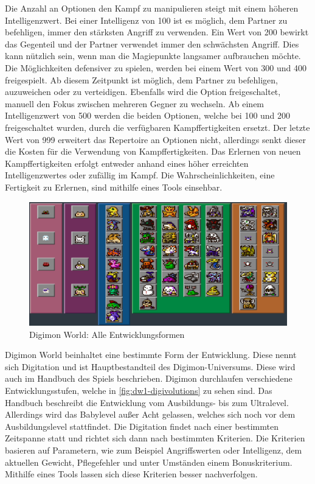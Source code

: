 Die Anzahl an Optionen den Kampf zu manipulieren steigt mit einem höheren Intelligenzwert. Bei einer Intelligenz von 100 ist es möglich, dem Partner zu befehligen, immer den stärksten Angriff zu verwenden. Ein Wert von 200 bewirkt das Gegenteil und der Partner verwendet immer den schwächsten Angriff. Dies kann nützlich sein, wenn man die Magiepunkte langsamer aufbrauchen möchte. Die Möglichkeiten defensiver zu spielen, werden bei einem Wert von 300 und 400 freigespielt. Ab diesem Zeitpunkt ist möglich, dem Partner zu befehligen, auzuweichen oder zu verteidigen. Ebenfalls wird die Option freigeschaltet, manuell den Fokus zwischen mehreren Gegner zu wechseln. Ab einem Intelligenzwert von 500 werden die beiden Optionen, welche bei 100 und 200 freigeschaltet wurden, durch die verfügbaren Kampffertigkeiten ersetzt. Der letzte Wert von 999 erweitert das Repertoire an Optionen nicht, allerdings senkt dieser die Kosten für die Verwendung von Kampffertigkeiten. Das Erlernen von neuen Kampffertigkeiten erfolgt entweder anhand eines höher erreichten Intelligenzwertes oder zufällig im Kampf. Die Wahrscheinlichkeiten, eine Fertigkeit zu Erlernen, sind mithilfe eines Tools einsehbar\cite{move-tool}. \\

\begin{figure}[H]
\begin{center}
\includegraphics[width=1\columnwidth]{figures/screenshots/digivolutions.png}
  \caption{\label{fig:dw1-digivolutions} Digimon World: Alle Entwicklungsformen}
\end{center}
\end{figure}

Digimon World beinhaltet eine bestimmte Form der Entwicklung. Diese nennt sich Digitation und ist Hauptbestandteil des Digimon-Universums. Diese wird auch im Handbuch des Spiels beschrieben. Digimon durchlaufen verschiedene Entwicklungsstufen, welche in \autoref{fig:dw1-digivolutions} zu sehen sind. Das Handbuch beschreibt die Entwicklung vom Ausbildungs- bis zum Ultralevel. Allerdings wird das Babylevel außer Acht gelassen, welches sich noch vor dem Ausbildungslevel stattfindet. Die Digitation findet nach einer bestimmten Zeitspanne statt und richtet sich dann nach bestimmten Kriterien. Die Kriterien basieren auf Parametern, wie zum Beispiel Angriffswerten oder Intelligenz, dem aktuellen Gewicht, Pflegefehler und unter Umständen einem Bonuskriterium. Mithilfe eines Tools lassen sich diese Kriterien besser nachverfolgen\cite{digivolution}. \\

